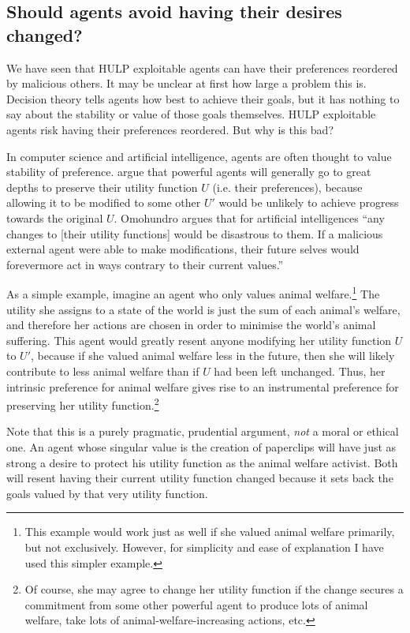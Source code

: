 \documentclass{article}
\begin{document}
\subsection{Should agents avoid having their desires changed?}

We have seen that HULP exploitable agents can have their preferences reordered by malicious others. It may be unclear at first how large a problem this is. Decision theory tells agents how best to achieve their goals, but it has nothing to say about the stability or value of those goals themselves. HULP exploitable agents risk having their preferences reordered. But why is this bad?

In computer science and artificial intelligence, agents are often thought to value stability of preference. \citet{omohundro2008basic,bostrom2012will} argue that powerful agents will generally go to great depths to preserve their utility function \(U\) (i.e. their preferences), because allowing it to be modified to some other \(U'\) would be unlikely to achieve progress towards the original \(U\). Omohundro argues that for artificial intelligences ``any changes to [their utility functions] would be disastrous to them. If a malicious external agent were able to make modifications, their future selves would forevermore act in ways contrary to their current values.''

As a simple example, imagine an agent who only values animal welfare.\footnote{This example would work just as well if she valued animal welfare primarily, but not exclusively. However, for simplicity and ease of explanation I have used this simpler example.} The utility she assigns to a state of the world is just the sum of each animal's welfare, and therefore her actions are chosen in order to minimise the world's animal suffering. This agent would greatly resent anyone modifying her utility function \(U\) to \(U'\), because if she valued animal welfare less in the future, then she will likely contribute to less animal welfare than if \(U\) had been left unchanged. Thus, her intrinsic preference for animal welfare gives rise to an instrumental preference for preserving her utility function.\footnote{Of course, she may agree to change her utility function if the change secures a commitment from some other powerful agent to produce lots of animal welfare, take lots of animal-welfare-increasing actions, etc.}

Note that this is a purely pragmatic, prudential argument, \textit{not} a moral or ethical one. An agent whose singular value is the creation of paperclips will have just as strong a desire to protect his utility function as the animal welfare activist. Both will resent having their current utility function changed because it sets back the goals valued by that very utility function.
\end{document}
